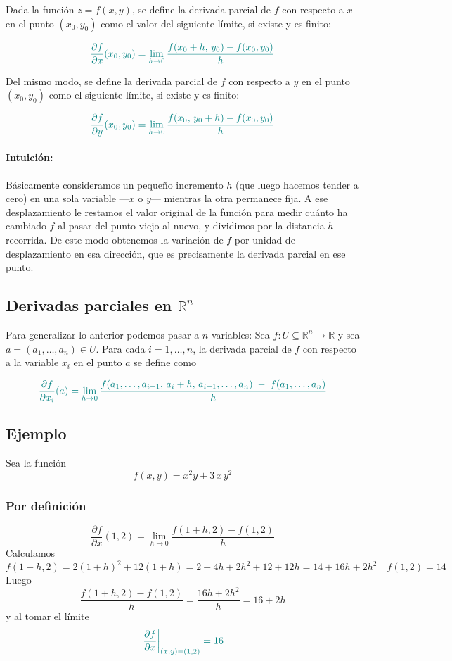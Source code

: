 \documentclass{article}
\begin{document}
Dada la función \(z = f(x,y)\), se define la derivada parcial de \(f\) con respecto a \(x\) en el punto \((x_{0},y_{0})\) como el valor del siguiente límite, si existe y es finito:

\[ \color{teal}
\frac{\partial f}{\partial x}(x_{0},y_{0})
=
\lim_{h\to0}
\frac{f(x_{0}+h,\,y_{0}) - f(x_{0},y_{0})}{h}
\]



Del mismo modo, se define la derivada parcial de \(f\) con respecto a \(y\) en el punto \((x_{0},y_{0})\) como el siguiente límite, si existe y es finito:

\[ \color{teal}
\frac{\partial f}{\partial y}(x_{0},y_{0})
=
\lim_{h\to0}
\frac{f(x_{0},\,y_{0}+h) - f(x_{0},y_{0})}{h}
\]
\paragraph*{Intuición:}

Básicamente consideramos un pequeño incremento \(h\) (que luego hacemos tender a cero) en una sola variable —\(x\) o \(y\)— mientras la otra permanece fija. A ese desplazamiento le restamos el valor original de la función para medir cuánto ha cambiado \(f\) al pasar del punto viejo al nuevo, y dividimos por la distancia \(h\) recorrida. De este modo obtenemos la variación de \(f\) por unidad de desplazamiento en esa dirección, que es precisamente la derivada parcial en ese punto.  



\subsection*{Derivadas parciales en \(\mathbb{R}^n\)}
Para generalizar lo anterior podemos pasar a $n$ variables:
Sea \(f\colon U\subseteq\mathbb{R}^n\to\mathbb{R}\) y sea \(a=(a_1,\dots,a_n)\in U\). Para cada \(i=1,\dots,n\), la derivada parcial de \(f\) con respecto a la variable \(x_i\) en el punto \(a\) se define como

\[
\color{teal}
\frac{\partial f}{\partial x_i}(a)
=
\lim_{h\to0}
\frac{f(a_1,\dots,a_{i-1},\,a_i+h,\,a_{i+1},\dots,a_n) \;-\; f(a_1,\dots,a_n)}{h}
\]


\subsection*{Ejemplo}

Sea la función  
\[
f(x,y)=x^{2}y + 3\,x\,y^{2}
\]

\subsubsection*{Por definición}
\[
\frac{\partial f}{\partial x}(1,2)
=
\lim_{h\to0}
\frac{f(1+h,2)-f(1,2)}{h}
\]
Calculamos
\[
f(1+h,2)
=2(1+h)^{2} + 12(1+h)
=2 + 4h + 2h^{2} + 12 + 12h
=14 + 16h + 2h^{2}
\quad
f(1,2)=14
\]
Luego
\[
\frac{f(1+h,2)-f(1,2)}{h}
=\frac{16h+2h^{2}}{h}
=16+2h
\]
y al tomar el límite
\[
\color{teal}
\left.\frac{\partial f}{\partial x}\right|_{(x,y)=(1,2)}
=16
\]
\end{document}
